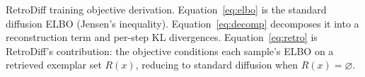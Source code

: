 \caption{RetroDiff training objective derivation. Equation~\eqref{eq:elbo} is the standard diffusion ELBO (Jensen's inequality). Equation~\eqref{eq:decomp} decomposes it into a reconstruction term and per-step KL divergences. Equation~\eqref{eq:retro} is RetroDiff's contribution: the objective conditions each sample's ELBO on a retrieved exemplar set $R(x)$, reducing to standard diffusion when $R(x)=\varnothing$.}
